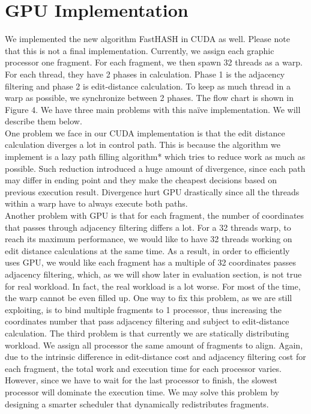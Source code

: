 \section{GPU Implementation} \label{sec:gpu} 

We implemented the new algorithm FastHASH in CUDA as well. Please note that
this is not a final implementation.  Currently, we assign each graphic
processor one fragment. For each fragment, we then spawn 32 threads as a warp.
For each thread, they have 2 phases in calculation. Phase 1 is the adjacency
filtering and phase 2 is edit-distance calculation. To keep as much thread in a
warp as possible, we synchronize between 2 phases. The flow chart is shown in
Figure 4.  We have three main problems with this naïve implementation. We will
describe them below. \\

One problem we face in our CUDA implementation is that the edit distance
calculation diverges a lot in control path. This is because the algorithm we
implement is a lazy path filling algorithm* which tries to reduce work as much
as possible. Such reduction introduced a huge amount of divergence, since each
path may differ in ending point and they make the cheapest decisions based on
previous execution result. Divergence hurt GPU drastically since all the
threads within a warp have to always execute both paths. \\

Another problem with GPU is that for each fragment, the number of coordinates
that passes through adjacency filtering differs a lot. For a 32 threads warp,
to reach its maximum performance, we would like to have 32 threads working on
edit distance calculations at the same time. As a result, in order to
efficiently uses GPU, we would like each fragment has a multiple of 32
coordinates passes adjacency filtering, which, as we will show later in
evaluation section, is not true for real workload. In fact, the real workload
is a lot worse. For most of the time, the warp cannot be even filled up. One
way to fix this problem, as we are still exploiting, is to bind multiple
fragments to 1 processor, thus increasing the coordinates number that pass
adjacency filtering and subject to edit-distance calculation.  The third
problem is that currently we are statically distributing workload. We assign
all processor the same amount of fragments to align. Again, due to the
intrinsic difference in edit-distance cost and adjacency filtering cost for
each fragment, the total work and execution time for each processor varies.
However, since we have to wait for the last processor to finish, the slowest
processor will dominate the execution time. We may solve this problem by
designing a smarter scheduler that dynamically redistributes fragments.\\
